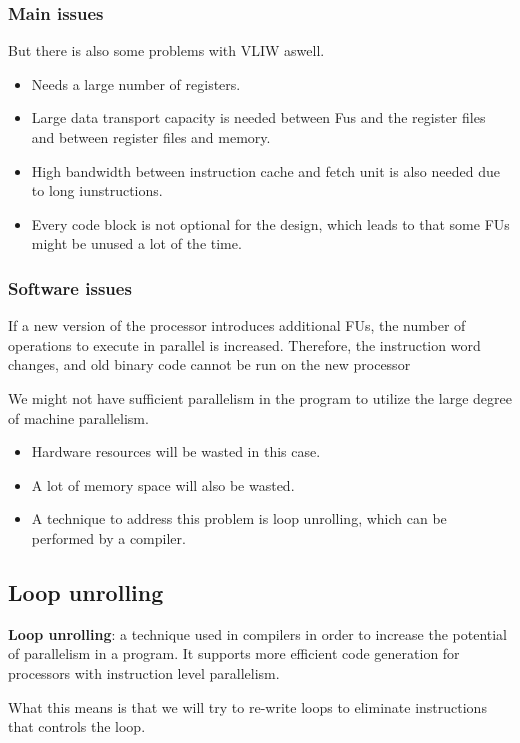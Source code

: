 \subsubsection{Main issues}
But there is also some problems with VLIW aswell.
\begin{itemize}
\item Needs a large number of registers.
\item Large data transport capacity is needed between Fus and the register files and between register files and memory.
\item High bandwidth between instruction cache and fetch unit is also needed due to long iunstructions.
\item Every code block is not optional for the design, which leads to that some FUs might be unused a lot of the time.
\end{itemize}
  
\subsubsection{Software issues}
If a new version of the processor introduces additional FUs, the number of operations to execute in parallel is increased. Therefore, the instruction word changes, and old binary
code cannot be run on the new processor

We might not have sufficient parallelism in the program to utilize the large degree of machine parallelism.
\begin{itemize}
\item Hardware resources will be wasted in this case.
\item  A lot of memory space will also be wasted.
\item A technique to address this problem is loop unrolling, which can be performed by a compiler. 
\end{itemize}

\subsection{Loop unrolling}
\textbf{Loop unrolling}: a technique used in compilers in order to increase the potential of parallelism in a program. It supports more efficient code generation for processors with instruction level parallelism.

What this means is that we will try to re-write loops to eliminate instructions that controls the loop.

